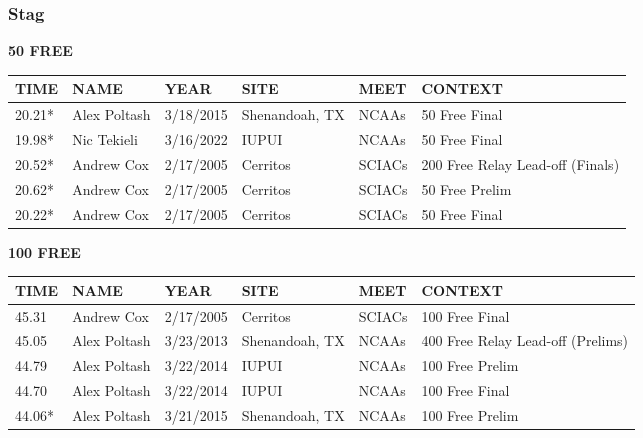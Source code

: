 \subsubsection{Stag}

\begin{minipage}[t]{0.48\textwidth}
\centering
\textbf{50 FREE}\\[0.05cm]
\begin{tabular}{@{}p{1.8cm}p{2.8cm}p{1.2cm}p{1.4cm}p{1.4cm}p{2.0cm}@{}}
\hline
\textbf{TIME} & \textbf{NAME} & \textbf{YEAR} & \textbf{SITE} & \textbf{MEET} & \textbf{CONTEXT} \\
\hline
20.21* & Alex Poltash & 3/18/2015 & Shenandoah, TX & NCAAs & 50 Free Final \\
19.98* & Nic Tekieli & 3/16/2022 & IUPUI & NCAAs & 50 Free Final \\
20.52* & Andrew Cox & 2/17/2005 & Cerritos & SCIACs & 200 Free Relay Lead-off (Finals) \\
20.62* & Andrew Cox & 2/17/2005 & Cerritos & SCIACs & 50 Free Prelim \\
20.22* & Andrew Cox & 2/17/2005 & Cerritos & SCIACs & 50 Free Final \\
\hline
\end{tabular}
\end{minipage}\hfill
\begin{minipage}[t]{0.48\textwidth}
\centering
\textbf{100 FREE}\\[0.05cm]
\begin{tabular}{@{}p{1.8cm}p{2.8cm}p{1.2cm}p{1.4cm}p{1.4cm}p{2.0cm}@{}}
\hline
\textbf{TIME} & \textbf{NAME} & \textbf{YEAR} & \textbf{SITE} & \textbf{MEET} & \textbf{CONTEXT} \\
\hline
45.31 & Andrew Cox & 2/17/2005 & Cerritos & SCIACs & 100 Free Final \\
45.05 & Alex Poltash & 3/23/2013 & Shenandoah, TX & NCAAs & 400 Free Relay Lead-off (Prelims) \\
44.79 & Alex Poltash & 3/22/2014 & IUPUI & NCAAs & 100 Free Prelim \\
44.70 & Alex Poltash & 3/22/2014 & IUPUI & NCAAs & 100 Free Final \\
44.06* & Alex Poltash & 3/21/2015 & Shenandoah, TX & NCAAs & 100 Free Prelim \\
\hline
\end{tabular}
\end{minipage}

\vspace{0.4cm}

